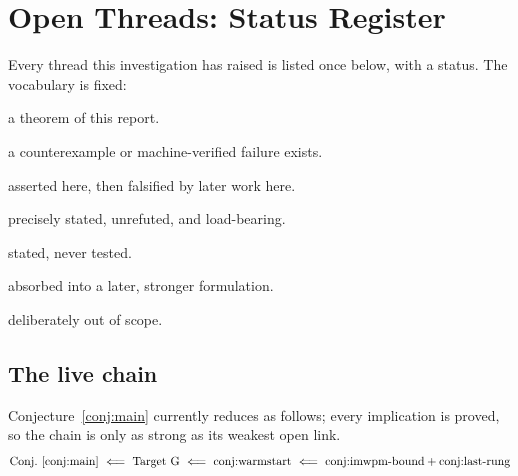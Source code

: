 \section{Open Threads: Status Register}
\label{sec:ideas}

Every thread this investigation has raised is listed once below, with a status.
The vocabulary is fixed:

\begin{description}\itemsep2pt
  \item[\textsc{proved}] a theorem of this report.
  \item[\textsc{refuted}] a counterexample or machine-verified failure exists.
  \item[\textsc{withdrawn}] asserted here, then falsified by later work here.
  \item[\textsc{open}] precisely stated, unrefuted, and load-bearing.
  \item[\textsc{unexplored}] stated, never tested.
  \item[\textsc{superseded}] absorbed into a later, stronger formulation.
  \item[\textsc{excluded}] deliberately out of scope.
\end{description}

\subsection*{The live chain}

Conjecture~\ref{conj:main} currently reduces as follows; every implication is
proved, so the chain is only as strong as its weakest open link.
\[
  \text{Conj.~\ref{conj:main}}
  \ \Longleftarrow\ \text{Target G}
  \ \Longleftarrow\ \text{conj:warmstart}
  \ \Longleftarrow\ \text{conj:imwpm-bound} + \text{conj:last-rung}
\]

